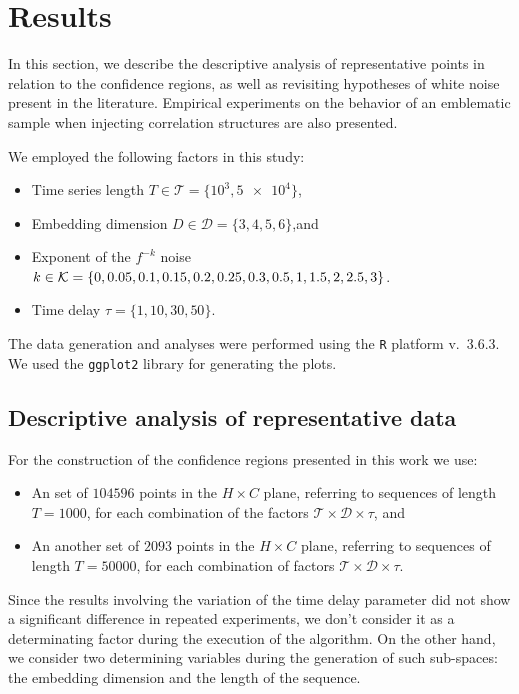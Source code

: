 \section{Results}\label{Sec:Results}

In this section, we describe the descriptive analysis of representative points in relation to the confidence regions, as well as revisiting hypotheses of white noise present in the literature.
Empirical experiments on the behavior of an emblematic sample when injecting correlation structures are also presented.

We employed the following factors in this study:
\begin{itemize}
\item Time series length $T\in\mathcal T=\{10^3, \num[scientific-notation=true]{5 e4}\}$,
\item Embedding dimension $D\in\mathcal D=\{3, 4, 5, 6\}$,and
\item Exponent of the $f^{-k}$ noise $k\in\mathcal K=\{0, 0.05, 0.1, 0.15, 0.2, 0.25, 0.3, 0.5, 1,\\ 1.5, 2, 2.5, 3\}$.
\item Time delay $\tau=\{1,10,30,50\}$.
\end{itemize}

The data generation and analyses were performed using the \texttt R platform \cite{Rmanual} v.~3.6.3.
We used the \texttt{ggplot2} library \cite{ggplot2Wickman} for generating the plots.

\subsection{Descriptive analysis of representative data}

For the construction of the confidence regions presented in this work we use:
\begin{itemize}
    \item An set of $104596$ points in the $H \times C$ plane, referring to sequences of length $T = 1000$, for each combination of the factors $\mathcal T \times \mathcal D \times \mathcal{\tau}$, and
    \item  An another set of $2093$ points in the $H \times C$ plane, referring to sequences of length $T = 50000$, for each combination of factors $\mathcal T \times \mathcal D \times \mathcal{\tau}$.
\end{itemize}
Since the results involving the variation of the time delay parameter did not show a significant difference in repeated experiments, we don't consider it as a determinating factor during the execution of the algorithm.
On the other hand, we consider two determining variables during the generation of such sub-spaces: the embedding dimension and the length of the sequence.

